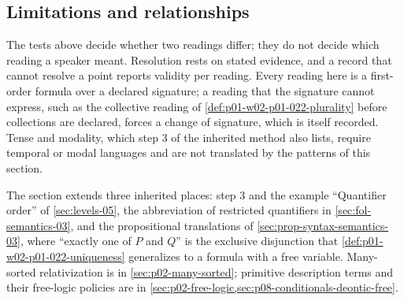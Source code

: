 \subsection{Limitations and relationships}
\label{sec:p01-w02-p01-022-limits}

The tests above decide whether two readings differ; they do not decide which
reading a speaker meant. Resolution rests on stated evidence, and a record
that cannot resolve a point reports validity per reading. Every reading here
is a first-order formula over a declared signature; a reading that the
signature cannot express, such as the collective reading of
\cref{def:p01-w02-p01-022-plurality} before collections are declared, forces
a change of signature, which is itself recorded. Tense and modality, which
step 3 of the inherited method also lists, require temporal or modal
languages and are not translated by the patterns of this section.

The section extends three inherited places: step 3 and the example
``Quantifier order'' of \cref{sec:levels-05}, the abbreviation of restricted
quantifiers in \cref{sec:fol-semantics-03}, and the propositional
translations of \cref{sec:prop-syntax-semantics-03}, where ``exactly one of
\(P\) and \(Q\)'' is the exclusive disjunction that
\cref{def:p01-w02-p01-022-uniqueness} generalizes to a formula with a free
variable. Many-sorted relativization is in \cref{sec:p02-many-sorted};
primitive description terms and their free-logic policies are in
\cref{sec:p02-free-logic,sec:p08-conditionals-deontic-free}.
